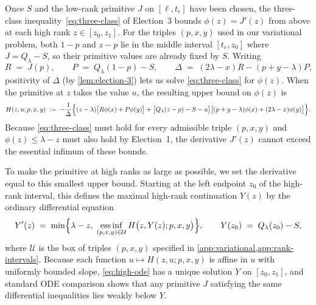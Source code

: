 \documentclass[11pt]{article}
\numberwithin{equation}{section}
\theoremstyle{plain}
\theoremstyle{definition}
\newcommand{\1}{\mathbf{1}}
\newcommand{\calU}{\mathcal{U}}
\begin{document}
Once $S$ and the low-rank primitive $J$ on $[\ell, t_e]$ have been chosen, the three-class inequality~\eqref{eq:three-class} of Election~3 bounds $\phi(z) = J'(z)$ from above at each high rank $z \in [z_0, z_1]$. For the triples $(p, x, y)$ used in our variational problem, both $1 - p$ and $z - p$ lie in the middle interval $[t_e, z_0]$ where $J = Q_\lambda - S$, so their primitive values are already fixed by $S$. Writing
\[
  R \;=\; J(p),
  \qquad
  P \;=\; Q_\lambda(1 - p) - S,
  \qquad
  \Delta \;=\; (2\lambda - x)R - (p + y - \lambda)P,
\]
positivity of $\Delta$ (by \cref{lem:election-3}) lets us solve \cref{eq:three-class} for $\phi(z)$. When the primitive at $z$ takes the value $u$, the resulting upper bound on $\phi(z)$ is
\begin{equation}
  H(z, u; p, x, y) \;:=\; -\frac{1}{\Delta}\Bigl\{
    (z - \lambda)\bigl[R\phi(x) + P\phi(y)\bigr]
    + \bigl[Q_\lambda(z - p) - S - u\bigr]\bigl[(p + y - \lambda)\phi(x) + (2\lambda - x)\phi(y)\bigr]
  \Bigr\}.
  \label{eq:H-def}
\end{equation}
Because \cref{eq:three-class} must hold for every admissible triple $(p, x, y)$ and $\phi(z) \le \lambda - z$ must also hold by Election~1, the derivative $J'(z)$ cannot exceed the essential infimum of these bounds.

To make the primitive at high ranks as large as possible, we set the derivative equal to this smallest upper bound. Starting at the left endpoint $z_0$ of the high-rank interval, this defines the maximal high-rank continuation $Y(z)$ by the ordinary differential equation
\begin{equation}
  Y'(z) \;=\; \min\Bigl\{\lambda - z,\; \operatorname*{ess\,inf}_{(p, x, y) \in \calU} H\bigl(z, Y(z); p, x, y\bigr)\Bigr\},
  \qquad
  Y(z_0) \;=\; Q_\lambda(z_0) - S,
  \label{eq:high-ode}
\end{equation}
where $\calU$ is the box of triples $(p, x, y)$ specified in \cref{app:variational,app:rank-intervals}. Because each function $u \mapsto H(z, u; p, x, y)$ is affine in $u$ with uniformly bounded slope, \cref{eq:high-ode} has a unique solution $Y$ on $[z_0, z_1]$, and standard ODE comparison shows that any primitive $J$ satisfying the same differential inequalities lies weakly below $Y$.
\end{document}
